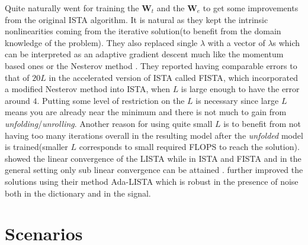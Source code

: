 Quite naturally \cite{Gregor2010} went for training the $\boldsymbol{W}_t$ and the $\boldsymbol{W}_e$ to get some improvements 
from the original \ac{ISTA}\cite{Daubechies2003} algorithm. It is natural as they kept the intrinsic 
nonlinearities coming from the iterative solution(to benefit from the domain knowledge of the problem). 
They also replaced single $\lambda$ with a vector of $\lambda$s which can be interpreted as an adaptive gradient descent 
much like the momentum based ones \cite{Boyd2004}\cite{Nocedal2006} or the Nesterov method \cite{Nesterov2004}\cite{Nesterov2018}. 
They reported having comparable errors to that of $20L$ in the accelerated version of 
\ac{ISTA}\cite{Daubechies2003} called \ac{FISTA}\cite{Beck2009}, which incorporated a modified Nesterov method 
\cite{Nesterov2004}\cite{Nesterov2018} into \ac{ISTA}, when $L$ is large enough to have the error around $4$. Putting some level of 
restriction on the $L$ is necessary since large $L$ means you are already near the minimum and there is not much to gain 
from \emph{unfolding}/\emph{unrolling}. Another reason for using quite small $L$ is to benefit from not having too many iterations 
overall in the resulting model after the \emph{unfolded} model is trained(smaller $L$ corresponds to 
small required \ac{FLOPS} to reach the solution). \cite{Chen2018} showed the 
linear convergence of the \ac{LISTA} while in \ac{ISTA} and \ac{FISTA} 
and in the general setting only sub linear convergence can be attained \cite{Daubechies2003}\cite{Beck2009}. \cite{Aberdam2020} further 
improved the solutions using their method \ac{Ada-LISTA} which is robust in the presence of noise both 
in the dictionary and in the signal.


\section{Scenarios}

